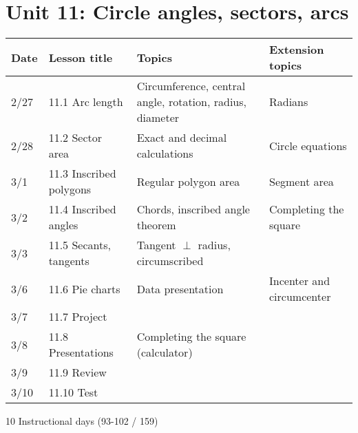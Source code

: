 \section*{Unit 11: Circle angles, sectors, arcs}
\begin{tabular}{|p{0.9cm}|p{4cm}|p{7cm}|p{5cm}|}
  \hline
  Date & Lesson title & Topics  & Extension topics \\
  \hline
  2/27 & 11.1 Arc length & Circumference, central angle, rotation, radius, diameter & Radians \\
  \hline
  2/28 & 11.2 Sector area & Exact and decimal calculations & Circle equations \\
  \hline
  3/1 & 11.3 Inscribed polygons & Regular polygon area & Segment area \\
  \hline
  3/2 & 11.4 Inscribed angles & Chords, inscribed angle theorem & Completing the square \\
  \hline
  3/3 & 11.5 Secants, tangents & Tangent $\perp$ radius, circumscribed &  \\
  \hline
  3/6 & 11.6 Pie charts & Data presentation & Incenter and circumcenter \\
  \hline
  3/7 & 11.7 Project &  & \\
  \hline
  3/8 & 11.8 Presentations & Completing the square (calculator) &  \\
  \hline
  3/9 & 11.9 Review &  &  \\
  \hline
  3/10 & 11.10 Test &  &  \\
  \hline

\end{tabular} \par \vspace*{0.3cm}
10 Instructional days (93-102 / 159)


